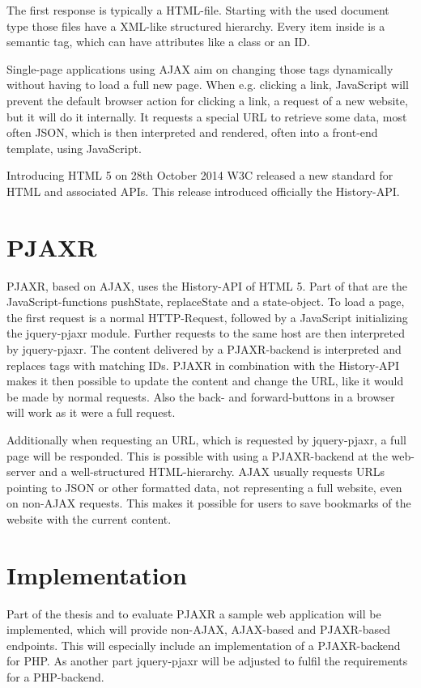 \documentclass[f,bachelor,binding,twoside,palatino]{WeSTthesis}
\def \ajax {AJAX}
\def \pjaxr {PJAXR}
\def \jqueryPjaxr {jquery-pjaxr}
\def \SinglePageApplication {Single-page application}
\begin{document}
  The first response is typically a HTML-file.
  Starting with the used document type those files have a XML-like structured hierarchy.
  Every item inside is a semantic tag, which can have attributes like a class or an ID.

  \SinglePageApplication{}s using \ajax{} aim on changing those tags dynamically without having to load a full new page.
  When e.g. clicking a link, JavaScript will prevent the default browser action for clicking a link, a request of a new website, but it will do it internally.
  It requests a special URL to retrieve some data, most often JSON, which is then interpreted and rendered, often into a front-end template, using JavaScript.

  Introducing HTML 5 on 28th October 2014 W3C released a new standard for HTML and associated APIs. 
  This release introduced officially the History-API.
  
\section{\pjaxr{}}
  \pjaxr{}, based on \ajax{}, uses the History-API of HTML 5.
  Part of that are the JavaScript-functions pushState, replaceState and a state-object.
  To load a page, the first request is a normal HTTP-Request, followed by a JavaScript initializing the \jqueryPjaxr{} module.
  Further requests to the same host are then interpreted by \jqueryPjaxr{}.
  The content delivered by a \pjaxr{}-backend is interpreted and replaces tags with matching IDs.
  \pjaxr{} in combination with the History-API makes it then possible to update the content and change the URL, like it would be made by normal requests.
  Also the back- and forward-buttons in a browser will work as it were a full request.
  
  Additionally when requesting an URL, which is requested by \jqueryPjaxr{}, a full page will be responded.
  This is possible with using a \pjaxr{}-backend at the web-server and a well-structured HTML-hierarchy.
  \ajax{} usually requests URLs pointing to JSON or other formatted data, not representing a full website, even on non-\ajax{} requests.
  This makes it possible for users to save bookmarks of the website with the current content.

\section{Implementation}
  Part of the thesis and to evaluate \pjaxr{} a sample web application will be implemented, which will provide non-\ajax{}, \ajax{}-based and \pjaxr{}-based endpoints.
  This will especially include an implementation of a \pjaxr{}-backend for PHP. As another part \jqueryPjaxr{} will be adjusted to fulfil the requirements for a PHP-backend.
\end{document}
